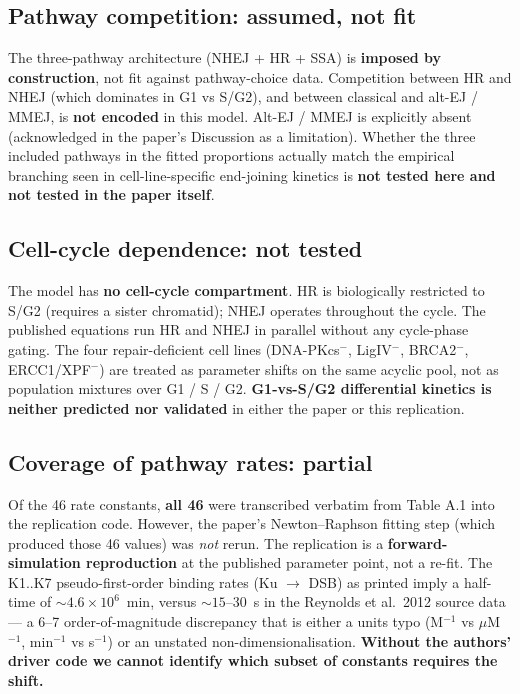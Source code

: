\documentclass[11pt]{article}
\begin{document}
\subsection*{Pathway competition: assumed, not fit}

The three-pathway architecture (NHEJ + HR + SSA) is \textbf{imposed by construction},
not fit against pathway-choice data. Competition between HR and NHEJ (which
dominates in G1 vs S/G2), and between classical and alt-EJ / MMEJ, is
\textbf{not encoded} in this model. Alt-EJ / MMEJ is explicitly absent
(acknowledged in the paper's Discussion as a limitation). Whether the three
included pathways in the fitted proportions actually match the empirical
branching seen in cell-line-specific end-joining kinetics is
\textbf{not tested here and not tested in the paper itself}.

\subsection*{Cell-cycle dependence: not tested}

The model has \textbf{no cell-cycle compartment}. HR is biologically restricted
to S/G2 (requires a sister chromatid); NHEJ operates throughout the cycle.
The published equations run HR and NHEJ in parallel without any cycle-phase
gating. The four repair-deficient cell lines (DNA-PKcs$^-$, LigIV$^-$, BRCA2$^-$,
ERCC1/XPF$^-$) are treated as parameter shifts on the same acyclic pool, not as
population mixtures over G1 / S / G2. \textbf{G1-vs-S/G2 differential kinetics is
neither predicted nor validated} in either the paper or this replication.

\subsection*{Coverage of pathway rates: partial}

Of the 46 rate constants, \textbf{all 46} were transcribed verbatim from Table A.1
into the replication code. However, the paper's Newton--Raphson fitting step
(which produced those 46 values) was \emph{not} rerun. The replication is a
\textbf{forward-simulation reproduction} at the published parameter point, not
a re-fit. The K1..K7 pseudo-first-order binding rates (Ku $\to$ DSB) as printed
imply a half-time of $\sim 4.6\times 10^6$~min, versus $\sim 15$--$30$~s in
the Reynolds et al.\ 2012 source data --- a 6--7 order-of-magnitude discrepancy
that is either a units typo (M$^{-1}$ vs $\mu$M$^{-1}$, min$^{-1}$ vs s$^{-1}$)
or an unstated non-dimensionalisation. \textbf{Without the authors' driver code
we cannot identify which subset of constants requires the shift.}
\end{document}
